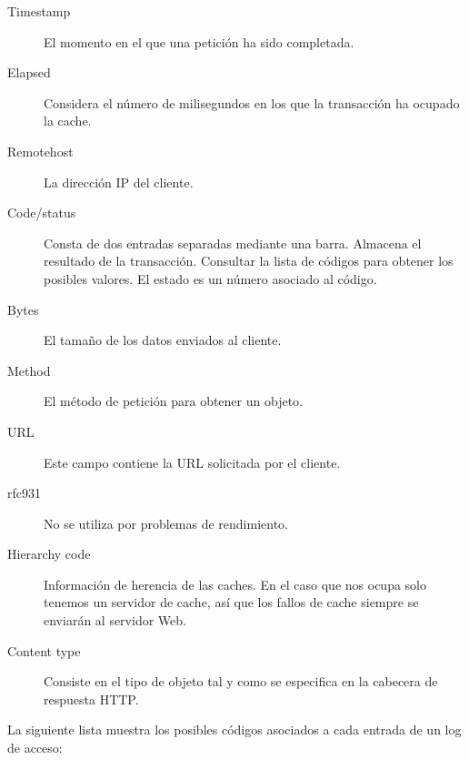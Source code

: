 \documentclass[twocolumn]{Jornadas}
\begin{document}
\begin{description}
\item[Timestamp] El momento en el que una petición ha sido completada.
\item[Elapsed] Considera el número de milisegundos en los que la transacción ha ocupado la cache.
\item[Remotehost] La dirección IP del cliente.
\item[Code/status] Consta de dos entradas separadas mediante una barra. Almacena el resultado de la transacción. Consultar la lista de códigos para obtener los posibles valores.
El estado es un número asociado al código.
\item[Bytes] El tamaño de los datos enviados al cliente.
\item[Method] El método de petición para obtener un objeto.
\item[URL] Este campo contiene la URL solicitada por el cliente.
\item[rfc931] No se utiliza por problemas de rendimiento.
\item[Hierarchy code] Información de herencia de las caches. En el caso que nos ocupa solo tenemos un servidor de cache, así que los fallos de cache siempre se enviarán al servidor Web. 
\item[Content type] Consiste en el tipo de objeto tal y como se especifica en la cabecera de respuesta HTTP.
\end{description}

La siguiente lista muestra los posibles códigos asociados a cada entrada de un log de acceso:
\end{document}
